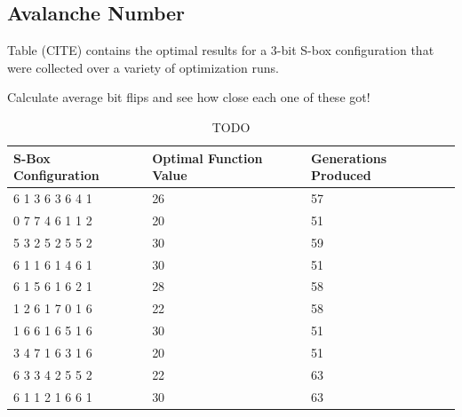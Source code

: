 \documentclass[11pt]{article}
\begin{document}
\subsection{Avalanche Number}

Table (CITE) contains the optimal results for a $3$-bit S-box configuration that were collected over a variety of optimization runs. 

Calculate average bit flips and see how close each one of these got!

\begin{table}
	\centering
	\label{avTable}
	\caption{TODO}
    \begin{tabular}{|l|l|l|}
        \hline
        S-Box Configuration & Optimal Function Value & Generations Produced \\ \hline
        6     1     3     6     3     6     4     1 & 26 & 57 \\ 
        0     7     7     4     6     1     1     2 & 20 & 51 \\ 
        5     3     2     5     2     5     5     2 & 30 & 59 \\ 
        6     1     1     6     1     4     6     1 & 30 & 51 \\ 
        6     1     5     6     1     6     2     1 & 28 & 58 \\ 
        1     2     6     1     7     0     1     6 & 22 & 58 \\ 
        1     6     6     1     6     5     1     6 & 30 & 51 \\ 
        3     4     7     1     6     3     1     6 & 20 & 51 \\ 
        6     3     3     4     2     5     5     2 & 22 & 63 \\ 
        6     1     1     2     1     6     6     1 & 30 & 63 \\
        \hline
    \end{tabular}
\end{table}
\end{document}

